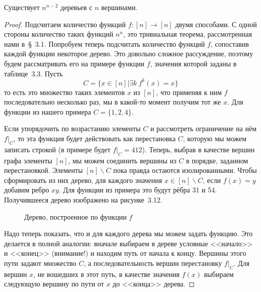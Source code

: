 \begin{thm}
Существует $n^{n-2}$ деревьев с $n$ вершинами.
\end{thm}
\begin{proof}
Подсчитаем количество функций $f:[n]\to[n]$ двумя способами. С одной стороны количество таких функций $n^n$, это тривиальная теорема, рассмотренная нами в~\S~3.1. Попробуем теперь подсчитать количество функций $f$, сопоставив каждой функции некоторое дерево. Это довольно сложное рассуждение, поэтому будем рассматривать его на примере функции $f$, значения которой заданы в таблице~3.3. Пусть
$$C = \{x \in[n]| \exists k\ f^k(x) = x\}$$
то есть это множество таких элементов $x$ из $[n]$, что применяя к ним $f$ последовательно несколько раз, мы в какой-то момент получим тот же $x$. Для функции из нашего примера $C = \{1,2,4\}$.

Если упорядочить по возрастанию элементы $C$ и рассмотреть ограничение на нём $f|_C$, то эта функция будет действовать как перестановка $C$, которую мы можем записать строкой (в примере будет $f|_C = 412$). Теперь, выбрав в качестве вершин графа элементы $[n]$, мы можем соединить вершины из $C$ в порядке, заданном перестановкой. Элементы $[n]\backslash C$ пока правда остаются изолированными. Чтобы сформировать из них дерево, для каждого значения $x\in [n]\backslash C$, если $f(x)=y$ добавим ребро $xy$. Для функции из примера это будут рёбра 31 и 54. Получившееся дерево изображено на рисунке~3.12.

\begin{figure}[h]
\centering
{}
\caption{Дерево, построенное по функции $f$}
\end{figure}

Надо теперь показать, что и для каждого дерева мы можем задать функцию. Это делается в полной аналогии: вначале выбираем в дереве условные <<начало>> и <<конец>> (внимание!) и находим путь от начала к концу. Вершины этого пути задают множество $C$, а последовательность вершин перестановку $f|_C$. Для вершин $x$, не вошедших в этот путь, в качестве значения $f(x)$ выбираем следующую вершину по пути от $x$ до <<конца>> дерева.


\end{proof}
